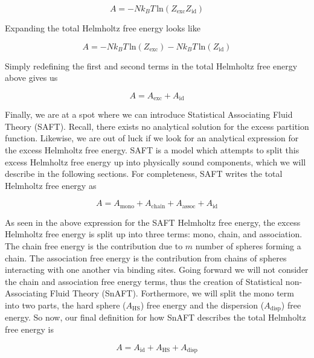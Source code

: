 \begin{equation}
A = -N k_B T \, \text{ln}(Z_{\text{exc}}Z_{\text{id}})
\end{equation}

Expanding the total Helmholtz free energy looks like

\begin{equation}
A = -N k_B T \, \text{ln}(Z_{\text{exc}}) -N k_B T \, \text{ln}(Z_{\text{id}})
\end{equation}

Simply redefining the first and second terms in the total Helmholtz free energy above gives us

\begin{equation}
A =  A_{\text{exc}} +  A_{\text{id}}
\end{equation}

Finally, we are at a spot where we can introduce Statistical Associating Fluid Theory (SAFT).  Recall, there exists no analytical solution for the excess partition function.  Likewise, we are out of luck if we look for an analytical expression for the excess Helmholtz free energy.  SAFT is a model which attempts to split this excess Helmholtz free energy up into physically sound components, which we will describe in the following sections.  For completeness, SAFT writes the total Helmholtz free energy as

\begin{equation}
A =  A_{\text{mono}} +  A_{\text{chain}} +  A_{\text{assoc}} + A_{\text{id}}
\end{equation}

As seen in the above expression for the SAFT Helmholtz free energy, the excess Helmholtz free energy is split up into three terms: mono, chain, and association.  The chain free energy is the contribution due to $m$ number of spheres forming a chain.  The association free energy is the contribution from chains of spheres interacting with one another via binding sites.  Going forward we will not consider the chain and association free energy terms, thus the creation of Statistical non-Associating Fluid Theory (SnAFT).  Forthermore, we will split the mono term into two parts, the hard sphere ($A_{\text{HS}}$) free energy and the dispersion ($A_{\text{disp}}$) free energy.  So now, our final definition for how SnAFT describes the total Helmholtz free energy is

\begin{equation}
A = A_{\text{id}} +  A_{\text{HS}} +  A_{\text{disp}}
\end{equation}

